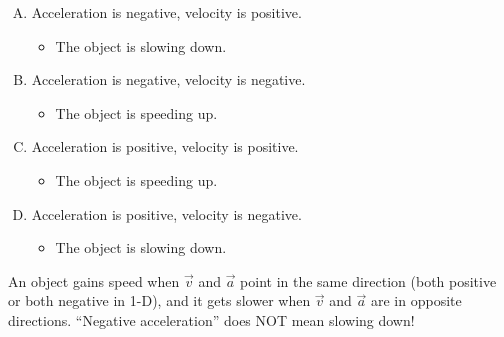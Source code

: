 \documentclass[]{article}
\begin{document}
\begin{TeacherMargin}
\begin{center}
\end{center}
\begin{enumerate}[(A)]
	\item Acceleration is negative, velocity is positive.
	\begin{itemize}
		\item The object is slowing down.
	\end{itemize}
	\item Acceleration is negative, velocity is negative.
	\begin{itemize}
		\item The object is speeding up.
	\end{itemize}
	\item Acceleration is positive, velocity is positive.
	\begin{itemize}
		\item The object is speeding up.
	\end{itemize}
	\item Acceleration is positive, velocity is negative.
	\begin{itemize}
		\item The object is slowing down.
	\end{itemize}
\end{enumerate}
An object gains speed when $\vec{v}$ and $\vec{a}$ point in the same direction (both positive or both negative in 1-D), and it gets slower when $\vec{v}$ and $\vec{a}$ are in opposite directions. ``Negative acceleration'' does NOT mean slowing down!


\end{TeacherMargin}
\end{document}
